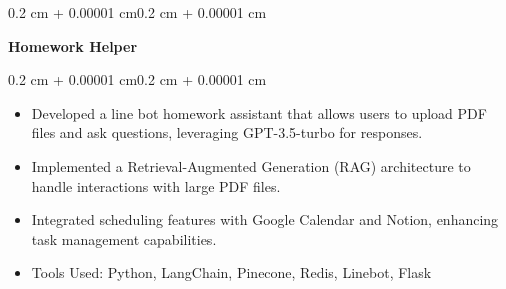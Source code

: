 \documentclass[10pt, letterpaper]{article}
\newenvironment{highlights}{
    \begin{itemize}[
        topsep=0.05 cm,
        parsep=0.05 cm,
        partopsep=0pt,
        itemsep=0pt,
        leftmargin=0.4 cm + 10pt
    ]
}{
    \end{itemize}
}
\newenvironment{onecolentry}{
    \begin{adjustwidth}{0.2 cm + 0.00001 cm}{0.2 cm + 0.00001 cm}
}{
    \end{adjustwidth}
}
\newenvironment{twocolentry}[2][]{
    \onecolentry
    \def\secondColumn{#2}
    \setcolumnwidth{\fill, 4.5 cm}
    \begin{paracol}{2}
}{
    \switchcolumn \raggedleft \secondColumn
    \end{paracol}
    \endonecolentry
}
\let\hrefWithoutArrow\href
\renewcommand{\href}[2]{\hrefWithoutArrow{#1}{\ifthenelse{\equal{#2}{}}{ }{#2 }\raisebox{.15ex}{\footnotesize \faExternalLink*}}}
\begin{document}
        \vspace{0.10 cm}
        \begin{twocolentry}{
        \textit{\href{https://github.com/ChuEating1005/Homework-Helper}{Link}}}
            \textbf{Homework Helper}
        \end{twocolentry}
        \vspace{0.05 cm}
        \begin{onecolentry}
            \begin{highlights}
                \item Developed a line bot homework assistant that allows users to upload PDF files and ask questions, leveraging GPT-3.5-turbo for responses.
                \item Implemented a Retrieval-Augmented Generation (RAG) architecture to handle interactions with large PDF files.
                \item Integrated scheduling features with Google Calendar and Notion, enhancing task management capabilities.
                \item Tools Used: Python, LangChain, Pinecone, Redis, Linebot, Flask
            \end{highlights}
        \end{onecolentry}
        
    
\end{document}
